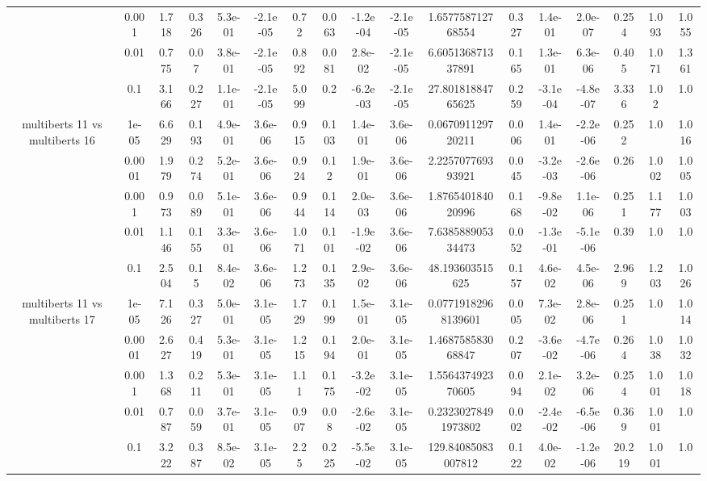 \begin{tabular}{|c|c|c|c|c|c|c|c|c|c|c|c|c|c|c|c|c|}
 & 0.001 & 1.718 & 0.326 & 5.3e-01 & -2.1e-05 & 0.72 & 0.063 & -1.2e-04 & -2.1e-05 & 1.657758712768554 & 0.327 & 1.4e-01 & 2.0e-07 & 0.254 & 1.093 & 1.055 \\
 & 0.01 & 0.775 & 0.07 & 3.8e-01 & -2.1e-05 & 0.892 & 0.081 & 2.8e-02 & -2.1e-05 & 6.605136871337891 & 0.165 & 1.3e-01 & 6.3e-06 & 0.405 & 1.071 & 1.361 \\
 & 0.1 & 3.166 & 0.227 & 1.1e-01 & -2.1e-05 & 5.099 & 0.2 & -6.2e-03 & -2.1e-05 & 27.80181884765625 & 0.259 & -3.1e-04 & -4.8e-07 & 3.336 & 1.02 & 1.0 \\
\hline
\multirow{5}{*}{multiberts 11 vs multiberts 16} & 1e-05 & 6.629 & 0.193 & 4.9e-01 & 3.6e-06 & 0.915 & 0.103 & 1.4e-01 & 3.6e-06 & 0.067091129720211 & 0.006 & 1.4e-01 & -2.2e-06 & 0.252 & 1.0 & 1.016 \\
 & 0.0001 & 1.979 & 0.274 & 5.2e-01 & 3.6e-06 & 0.924 & 0.12 & 1.9e-01 & 3.6e-06 & 2.225707769393921 & 0.045 & -3.2e-03 & -2.6e-06 & 0.26 & 1.002 & 1.005 \\
 & 0.001 & 0.973 & 0.089 & 5.1e-01 & 3.6e-06 & 0.944 & 0.114 & 2.0e-03 & 3.6e-06 & 1.876540184020996 & 0.168 & -9.8e-02 & 1.1e-06 & 0.251 & 1.177 & 1.003 \\
 & 0.01 & 1.146 & 0.155 & 3.3e-01 & 3.6e-06 & 1.071 & 0.101 & -1.9e-02 & 3.6e-06 & 7.638588905334473 & 0.052 & -1.3e-01 & -5.1e-06 & 0.39 & 1.0 & 1.0 \\
 & 0.1 & 2.504 & 0.15 & 8.4e-02 & 3.6e-06 & 1.273 & 0.135 & 2.9e-02 & 3.6e-06 & 48.193603515625 & 0.157 & 4.6e-02 & 4.5e-06 & 2.969 & 1.203 & 1.026 \\
\hline
\multirow{5}{*}{multiberts 11 vs multiberts 17} & 1e-05 & 7.126 & 0.327 & 5.0e-01 & 3.1e-05 & 1.729 & 0.199 & 1.5e-01 & 3.1e-05 & 0.07719182968139601 & 0.005 & 7.3e-02 & 2.8e-06 & 0.251 & 1.0 & 1.014 \\
 & 0.0001 & 2.627 & 0.419 & 5.3e-01 & 3.1e-05 & 1.215 & 0.194 & 2.0e-01 & 3.1e-05 & 1.468758583068847 & 0.207 & -3.6e-02 & -4.7e-06 & 0.264 & 1.038 & 1.032 \\
 & 0.001 & 1.368 & 0.211 & 5.3e-01 & 3.1e-05 & 1.11 & 0.175 & -3.2e-02 & 3.1e-05 & 1.556437492370605 & 0.094 & 2.1e-02 & 3.2e-06 & 0.254 & 1.001 & 1.018 \\
 & 0.01 & 0.787 & 0.059 & 3.7e-01 & 3.1e-05 & 0.907 & 0.08 & -2.6e-02 & 3.1e-05 & 0.23230278491973802 & 0.002 & -2.4e-02 & -6.5e-06 & 0.369 & 1.001 & 1.0 \\
 & 0.1 & 3.222 & 0.387 & 8.5e-02 & 3.1e-05 & 2.25 & 0.225 & -5.5e-02 & 3.1e-05 & 129.84085083007812 & 0.122 & 4.0e-02 & -1.2e-06 & 20.219 & 1.001 & 1.0 \\

\end{tabular}
